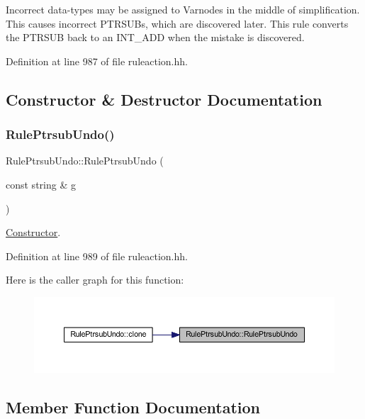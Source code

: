 Incorrect data-\/types may be assigned to Varnodes in the middle of simplification. This causes incorrect P\+T\+R\+S\+U\+Bs, which are discovered later. This rule converts the P\+T\+R\+S\+UB back to an I\+N\+T\+\_\+\+A\+DD when the mistake is discovered. 

Definition at line 987 of file ruleaction.\+hh.



\subsection{Constructor \& Destructor Documentation}
\mbox{\label{class_rule_ptrsub_undo_a33a385f41004f1aae1997e3d8d2b64da}} 
\subsubsection{\texorpdfstring{RulePtrsubUndo()}{RulePtrsubUndo()}}
{\footnotesize\ttfamily Rule\+Ptrsub\+Undo\+::\+Rule\+Ptrsub\+Undo (\begin{DoxyParamCaption}\item[{const string \&}]{g }\end{DoxyParamCaption})\hspace{0.3cm}{\ttfamily [inline]}}



\mbox{\hyperlink{class_constructor}{Constructor}}. 



Definition at line 989 of file ruleaction.\+hh.

Here is the caller graph for this function\+:
\nopagebreak
\begin{figure}[H]
\begin{center}
\leavevmode
\includegraphics[width=350pt]{class_rule_ptrsub_undo_a33a385f41004f1aae1997e3d8d2b64da_icgraph}
\end{center}
\end{figure}


\subsection{Member Function Documentation}
\mbox{\label{class_rule_ptrsub_undo_abba2872c347b72aab45c05d4a674d555}} 
